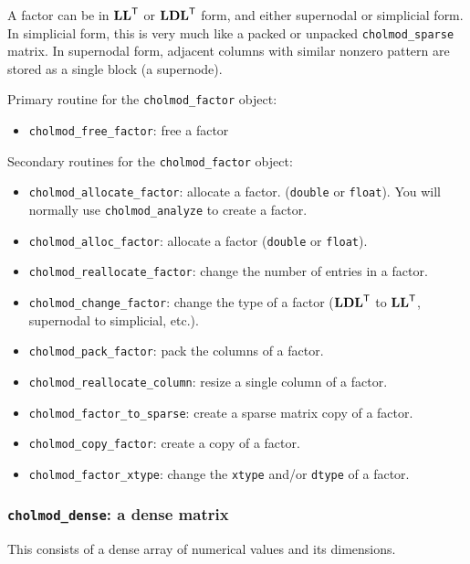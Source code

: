 \documentclass[11pt]{article}
\newcommand{\m}[1]{{\bf{#1}}}       %
\newcommand{\tr}{^{\sf T}}          %
\begin{document}
A factor can be in $\m{LL}\tr$ or $\m{LDL}\tr$ form, and either supernodal or
simplicial form.  In simplicial form, this is very much like a packed or
unpacked {\tt cholmod\_sparse} matrix.  In supernodal form, adjacent columns
with similar nonzero pattern are stored as a single block (a supernode).

\vspace{0.1in}
\noindent Primary routine for the {\tt cholmod\_factor} object:
    \begin{itemize}
    \item {\tt cholmod\_free\_factor}: free a factor
    \end{itemize}

\noindent Secondary routines for the {\tt cholmod\_factor} object:
    \begin{itemize}
    \item {\tt cholmod\_allocate\_factor}: allocate a factor.
    ({\tt double} or {\tt float}).
    You will normally use {\tt cholmod\_analyze} to create a factor.
    \item {\tt cholmod\_alloc\_factor}: allocate a factor
    ({\tt double} or {\tt float}).
    \item {\tt cholmod\_reallocate\_factor}: change the number of entries in a
    factor.
    \item {\tt cholmod\_change\_factor}: change the type of a factor
    ($\m{LDL}\tr$ to $\m{LL}\tr$, supernodal to simplicial, etc.).
    \item {\tt cholmod\_pack\_factor}: pack the columns of a factor.
    \item {\tt cholmod\_reallocate\_column}: resize a single column of a factor.
    \item {\tt cholmod\_factor\_to\_sparse}: create a sparse matrix copy of a
    factor.
    \item {\tt cholmod\_copy\_factor}: create a copy of a factor.
    \item {\tt cholmod\_factor\_xtype}: change the {\tt xtype} and/or
        {\tt dtype} of a factor.
    \end{itemize}

\subsubsection{{\tt cholmod\_dense}: a dense matrix}
    This consists of a dense array of numerical values and its dimensions.
\end{document}
